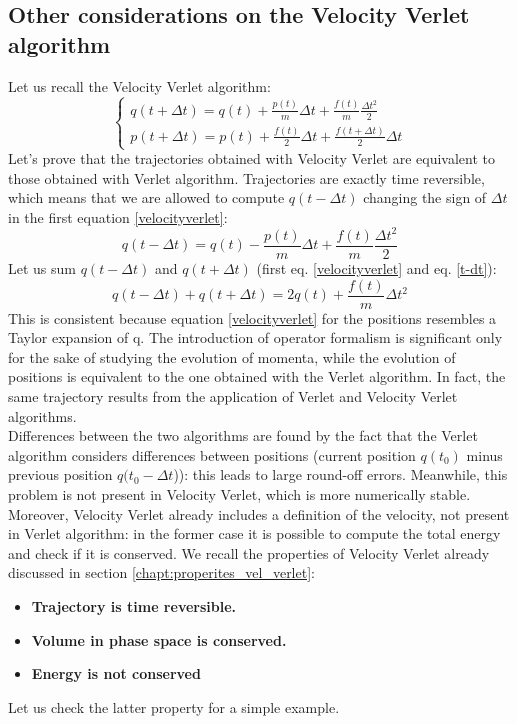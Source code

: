 \subsection{Other considerations on the Velocity Verlet algorithm}
Let us recall the Velocity Verlet algorithm:
    \begin{equation}\label{velocityverlet}
            \begin{cases}
                q(t+\Delta t)= q(t)+\frac{p(t)}{m}\Delta t+ \frac{f(t)}{m}\frac{\Delta t^2}{2}\\
                p(t+\Delta t)= p(t)+\frac{f(t)}{2}\Delta t+ \frac{f(t+\Delta t)}{2}\Delta t
            \end{cases}
            \end{equation}
Let's prove that the trajectories obtained with Velocity Verlet are equivalent to those obtained with Verlet algorithm. Trajectories are exactly time reversible, which means that we are allowed to compute $q(t-\Delta t)$ changing the sign of $\Delta t$ in the first equation \ref{velocityverlet}:
\begin{equation}\label{t-dt}
q(t-\Delta t)= q(t)-\frac{p(t)}{m}\Delta t+ \frac{f(t)}{m}\frac{\Delta t^2}{2}
\end{equation}
Let us sum $q(t-\Delta t)$ and $q(t+\Delta t)$ (first eq. \ref{velocityverlet} and eq. \ref{t-dt}):
\begin{equation*}
    q(t-\Delta t)+q(t+\Delta t)=2q(t)+\frac{f(t)}{m}\Delta t^2
\end{equation*}
This is consistent because equation \ref{velocityverlet} for the positions resembles a Taylor expansion of q.  The introduction of operator formalism is significant only for the sake of studying the evolution of momenta, while the evolution of positions is equivalent to the one obtained with the Verlet algorithm. 
In fact, the same trajectory results from the application of Verlet and Velocity Verlet algorithms.\\
Differences between the two algorithms are found by the fact that the Verlet algorithm considers differences between positions (current position $q(t_0)$ minus previous position $q(t_0-\Delta t$)): this leads to large round-off errors. Meanwhile, this problem is not present in Velocity Verlet, which is more numerically stable. Moreover, Velocity Verlet already includes a definition of the velocity, not present in Verlet algorithm: in the former case it is possible to compute the total energy and check if it is conserved.
We recall the properties of Velocity Verlet already discussed in section \ref{chapt:properites_vel_verlet}:
\begin{itemize}
\item \textbf{Trajectory is time reversible.}
\item \textbf{Volume in phase space is conserved.}
\item \textbf{Energy is not conserved}
\end{itemize}
Let us check the latter property for a simple example.
